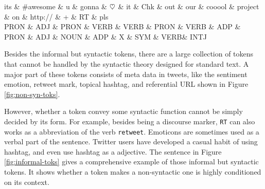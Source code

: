 \documentclass[11pt,letterpaper]{article}
\newcommand{\heart}{\ensuremath\heartsuit}
\begin{document}
\begin{figure*}[t]
	\centering
	\small
	\begin{dependency}[edge slant=2, text only label, label style=above]
		\begin{deptext}
			its \& \#awesome \& u \& gonna \& $\heart$ \& it \& Chk \& out \& our \& cooool \& project \& on \& http:// \& + \& RT \& pls\\
			\tiny PRON \& \tiny ADJ \& \tiny PRON \& \tiny VERB \& \tiny VERB \& \tiny PRON \& \tiny VERB \& \tiny ADP \& \tiny PRON \& \tiny ADJ \& \tiny NOUN \& \tiny ADP \& \tiny X \& \tiny SYM \& \tiny VERB\& \tiny INTJ\\
		\end{deptext}
	\end{dependency}
	\caption{An example tweet with informal but syntactic tokens.}\label{fig:informal-toks}
\end{figure*}

Besides the informal but syntactic tokens, there are a large collection of tokens that cannot be handled by the syntactic theory designed for standard text.
A major part of these tokens consists of meta data in tweets, like the sentiment emotion, retweet mark, topical hashtag, and referential URL shown in Figure \ref{fig:non-syn-toks}. 

However, whether a token convey some syntactic function cannot be simply decided by its form.
For example, besides being a discourse marker, {\tt RT} can also works as a abbreviation of the verb {\tt retweet}.
Emoticons are sometimes used as a verbal part of the sentence.
Twitter users have developed a casual habit of using hashtag, and even use hashtag as a adjective.
The sentence in Figure \ref{fig:informal-toks} gives a comprehensive example of those informal but syntactic tokens.
It shows whether a token makes a non-syntactic one is highly conditioned on its context.
\end{document}
